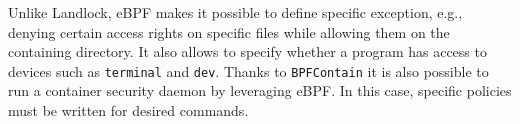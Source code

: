 Unlike Landlock, eBPF makes it possible to define specific exception, e.g., denying
certain access rights on specific files while allowing them on the containing directory.
It also allows to specify whether a program has access to devices such as \texttt{terminal}
and \texttt{dev}.
Thanks to \texttt{BPFContain} \cite{bpfcontain}
it is also possible to run a container security daemon by leveraging eBPF.  In this case,
specific policies must be written for desired commands.